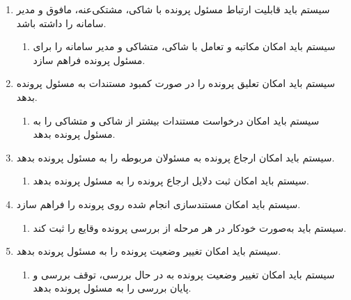 \documentclass[12pt,a4paper,oneside]{article}
\begin{document}
\begin{itemize}
\begin{enumerate}
        \item 
        سیستم باید قابلیت ارتباط مسئول پرونده با شاکی، مشتکی‌عنه، مافوق و مدیر سامانه را داشته باشد.
        \begin{enumerate}
            \renewcommand{\labelenumii}{\textbf{.R\arabic{enumi}.\arabic{enumii}}}
            \item 
            سیستم باید امکان مکاتبه و تعامل با شاکی، متشاکی و مدیر سامانه را برای مسئول پرونده فراهم سازد.
        \end{enumerate}

        \item 
        سیستم باید امکان تعلیق پرونده را در صورت کمبود مستندات به مسئول پرونده بدهد.
        \begin{enumerate}
            \renewcommand{\labelenumii}{\textbf{.R\arabic{enumi}.\arabic{enumii}}}
            \item 
            سیستم باید امکان درخواست مستندات بیشتر از شاکی و متشاکی را به مسئول پرونده بدهد.
        \end{enumerate}

        \item 
        سیستم باید امکان ارجاع پرونده به مسئولان مربوطه را به مسئول پرونده بدهد.
        \begin{enumerate}
            \renewcommand{\labelenumii}{\textbf{.R\arabic{enumi}.\arabic{enumii}}}
            \item 
            سیستم باید امکان ثبت دلایل ارجاع پرونده را به مسئول پرونده بدهد.
        \end{enumerate}

        \item 
        سیستم باید امکان مستندسازی انجام شده روی پرونده را فراهم سازد.
        \begin{enumerate}
            \renewcommand{\labelenumii}{\textbf{.R\arabic{enumi}.\arabic{enumii}}}
            \item 
            سیستم باید به‌صورت خودکار در هر مرحله از بررسی پرونده وقایع را ثبت کند.
        \end{enumerate}

        \item 
        سیستم باید امکان تغییر وضعیت پرونده را به مسئول پرونده بدهد.
        \begin{enumerate}
            \renewcommand{\labelenumii}{\textbf{.R\arabic{enumi}.\arabic{enumii}}}
            \item 
            سیستم باید امکان تغییر وضعیت پرونده به در حال بررسی، توقف بررسی و پایان بررسی را به مسئول پرونده بدهد.
        \end{enumerate}


\end{enumerate}
\end{itemize}
\end{document}
